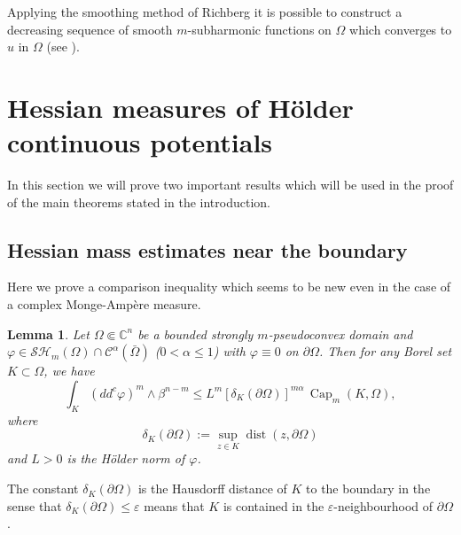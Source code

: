 \documentclass[11pt]{article}
\providecommand{\C}{}
\numberwithin{equation}{section}
\DeclareMathOperator{\dist}{dist}
\newtheorem{lemma}[theorem]{Lemma}
\theoremstyle{definition}
\renewcommand{\C}{\mathbb{C}}
\newcommand{\Cc}{\mathcal{C}}
\DeclareMathOperator{\Capa}{Cap}
\theoremstyle{plain}
\theoremstyle{definition}
\begin{document}
Applying the smoothing method of Richberg it is possible to construct a decreasing sequence of smooth $m$-subharmonic functions on $\Omega$ which converges to $u$ in $ \Omega$ (see \cite{P14}).

\section{Hessian measures of Hölder continuous potentials}\label{sec:4}

In this section we will prove two important results which will be used in the proof of the main theorems stated in the introduction.

\subsection{Hessian mass estimates near the boundary}

Here we prove a comparison inequality which seems to be new even in the case of a complex Monge-Ampère measure.

\begin{lemma} \label{lem:ComparisonIneq}
Let $\Omega \Subset \C^n$ be a bounded strongly $m$-pseudoconvex domain and $\varphi \in \mathcal{SH}_m(\Omega)\cap \Cc^{\alpha} (\bar{\Omega})$ ($0 < \alpha \leq 1$) with $\varphi \equiv 0$ on $\partial \Omega$. Then for any Borel set $K \subset \Omega$, we have
\[
\int_K (dd^c\varphi)^m\wedge\beta^{n-m} \leq L^m \left[\delta_K (\partial \Omega)\right]^{ m \alpha} \, \Capa_m (K,\Omega),
\]
where
\[
\delta_K (\partial \Omega):= \sup_{z \in K} \dist (z, \partial \Omega)
\]
and $L > 0$ is the Hölder norm of $\varphi$.
\end{lemma}
The constant $\delta_K (\partial \Omega)$ is the Hausdorff distance of $K$ to the boundary in the sense that $\delta_K (\partial \Omega) \leq \varepsilon $ means that $K$ is contained in the $\varepsilon$-neighbourhood of $\partial \Omega$.
\end{document}
